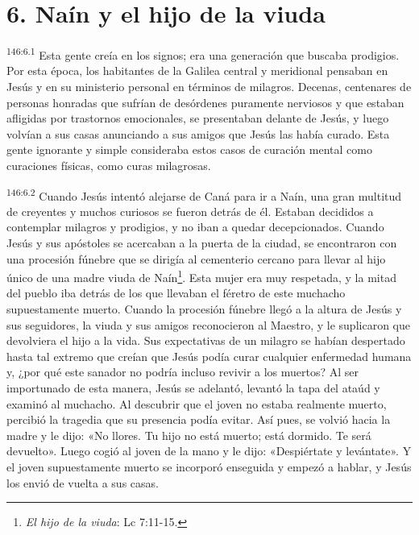 \section*{6. Naín y el hijo de la viuda}
\par 
\textsuperscript{146:6.1} Esta gente creía en los signos; era una generación que buscaba prodigios. Por esta época, los habitantes de la Galilea central y meridional pensaban en Jesús y en su ministerio personal en términos de milagros. Decenas, centenares de personas honradas que sufrían de desórdenes puramente nerviosos y que estaban afligidas por trastornos emocionales, se presentaban delante de Jesús, y luego volvían a sus casas anunciando a sus amigos que Jesús las había curado. Esta gente ignorante y simple consideraba estos casos de curación mental como curaciones físicas, como curas milagrosas.

\par 
\textsuperscript{146:6.2} Cuando Jesús intentó alejarse de Caná para ir a Naín, una gran multitud de creyentes y muchos curiosos se fueron detrás de él. Estaban decididos a contemplar milagros y prodigios, y no iban a quedar decepcionados. Cuando Jesús y sus apóstoles se acercaban a la puerta de la ciudad, se encontraron con una procesión fúnebre que se dirigía al cementerio cercano para llevar al hijo único de una madre viuda de Naín\footnote{\textit{El hijo de la viuda}: Lc 7:11-15.}. Esta mujer era muy respetada, y la mitad del pueblo iba detrás de los que llevaban el féretro de este muchacho supuestamente muerto. Cuando la procesión fúnebre llegó a la altura de Jesús y sus seguidores, la viuda y sus amigos reconocieron al Maestro, y le suplicaron que devolviera el hijo a la vida. Sus expectativas de un milagro se habían despertado hasta tal extremo que creían que Jesús podía curar cualquier enfermedad humana y, ¿por qué este sanador no podría incluso revivir a los muertos? Al ser importunado de esta manera, Jesús se adelantó, levantó la tapa del ataúd y examinó al muchacho. Al descubrir que el joven no estaba realmente muerto, percibió la tragedia que su presencia podía evitar. Así pues, se volvió hacia la madre y le dijo: «No llores. Tu hijo no está muerto; está dormido. Te será devuelto». Luego cogió al joven de la mano y le dijo: «Despiértate y levántate». Y el joven supuestamente muerto se incorporó enseguida y empezó a hablar, y Jesús los envió de vuelta a sus casas.

